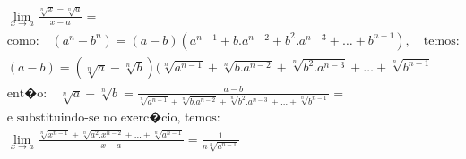 \begin{ex}
\begin{align}
&\lim_{x\rightarrow a} \frac{\sqrt[n]{x}-\sqrt[n]{a}}{x-a}=\nonumber\\
&\text{como:}\quad (a^n-b^n)=(a-b)(a^{n-1}+b.a^{n-2}+b^2.a^{n-3}+\dots+b^{n-1}),\quad\text{temos:}\nonumber\\
&(a-b) = (\sqrt[n]{a}-\sqrt[n]{b})(\sqrt[n]{a^{n-1}}+\sqrt[n]{b.a^{n-2}}+\sqrt[n]{b^2.a^{n-3}}+\dots+\sqrt[n]{b^{n-1}}\nonumber\\
&\text{ent�o:}\quad\sqrt[n]{a}-\sqrt[n]{b}=\frac{a-b}{\sqrt[n]{a^{n-1}}+\sqrt[n]{b.a^{n-2}}+\sqrt[n]{b^2.a^{n-3}}+\dots+\sqrt[n]{b^{n-1}}}=\nonumber\\
&\text{e substituindo-se no exerc�cio, temos:}\nonumber\\
&\lim_{x\rightarrow a} \frac{\sqrt[n]{x^{n-1}}+\sqrt[n]{a^2.x^{n-2}}+\dots+\sqrt[n]{a^{n-1}}}{x-a}=\frac{1}{n\sqrt[n]{a^{n-1}}}\nonumber
\end{align}
\end{ex}